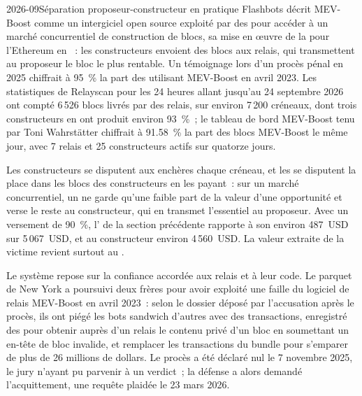 \begin{dated}{2026-09}{Séparation proposeur-constructeur en pratique}\label{dat:m3:maximal-extractable-value:boost}
Flashbots décrit MEV-Boost comme un intergiciel open source exploité par des  pour accéder à un marché concurrentiel de construction de blocs, sa mise en œuvre de
la  pour l'Ethereum en ~: les constructeurs envoient des blocs aux relais, qui transmettent au proposeur le bloc le plus rentable.
Un témoignage lors d'un procès pénal en 2025 chiffrait à 95~\% la part des  utilisant MEV-Boost en avril 2023. Les statistiques de Relayscan pour les 24 heures allant jusqu'au 24
septembre 2026 ont compté 6\,526 blocs livrés par des relais, sur environ 7\,200 créneaux, dont trois constructeurs en ont produit environ 93~\%~; le
tableau de bord MEV-Boost tenu par Toni Wahrstätter chiffrait à 91.58~\% la part des blocs MEV-Boost le même jour, avec 7 relais et 25
constructeurs actifs sur quatorze jours.
\end{dated}

Les constructeurs se disputent aux enchères chaque créneau, et les  se disputent la place dans les blocs des constructeurs en les payant~: sur un marché concurrentiel, un
 ne garde qu'une faible part de la valeur d'une opportunité et verse le reste au constructeur, qui en transmet l'essentiel au proposeur. Avec un
versement de 90~\%, l' de la section précédente rapporte à son  environ 487~USD sur 5\,067~USD, et au constructeur environ 4\,560~USD. La valeur
extraite de la victime revient surtout au .

Le système repose sur la confiance accordée aux relais et à leur code. Le parquet de New York a poursuivi deux frères pour avoir exploité une faille du logiciel de relais MEV-Boost en
avril 2023~: selon le dossier déposé par l'accusation après le procès, ils ont piégé les bots sandwich d'autres  avec des transactions, enregistré des  pour
obtenir auprès d'un relais le contenu privé d'un bloc en soumettant un en-tête de bloc invalide, et remplacer les transactions du bundle pour s'emparer de plus de 26
millions de dollars. Le procès a été déclaré nul le 7 novembre 2025, le jury n'ayant pu parvenir à un verdict~; la défense a alors demandé l'acquittement, une requête
plaidée le 23 mars 2026.

